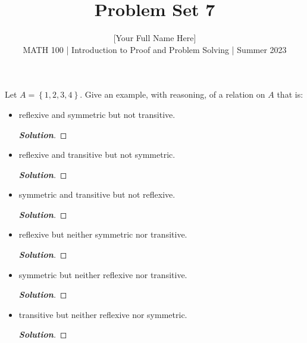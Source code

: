 \documentclass[11pt]{article}
\newenvironment{problem}[2][Problem\!]{\begin{trivlist}
\item[\hskip \labelsep {\bfseries #1}\hskip \labelsep {\bfseries #2.}]}{\end{trivlist}}
\newenvironment{solution}{\begin{proof}[\textbf{\textit{Solution}}]}{\end{proof}}
\newcommand{\set}[1]{\left\{#1\right\}} %
\begin{document}
 
\title{Problem Set 7}
\author{[Your Full Name Here]\\[0.5em]
MATH 100 | Introduction to Proof and Problem Solving | Summer 2023}
\date{} 
\maketitle


\begin{problem}{7.1}
Let $A = \set{1, 2, 3, 4}$. Give an example, with reasoning, of a relation on $A$ that is:
\begin{itemize}[itemsep=2em]
\item[(a)] reflexive and symmetric but not transitive.
\begin{solution}
\end{solution}

\item[(b)] reflexive and transitive but not symmetric.
\begin{solution}
\end{solution}

\item[(c)] symmetric and transitive but not reflexive.
\begin{solution}
\end{solution}

\item[(d)] reflexive but neither symmetric nor transitive.
\begin{solution}
\end{solution}

\item[(e)] symmetric but neither reflexive nor transitive.
\begin{solution}
\end{solution}

\item[(f)] transitive but neither reflexive nor symmetric.
\begin{solution}
\end{solution}

\end{itemize}
\end{problem}
\end{document}
